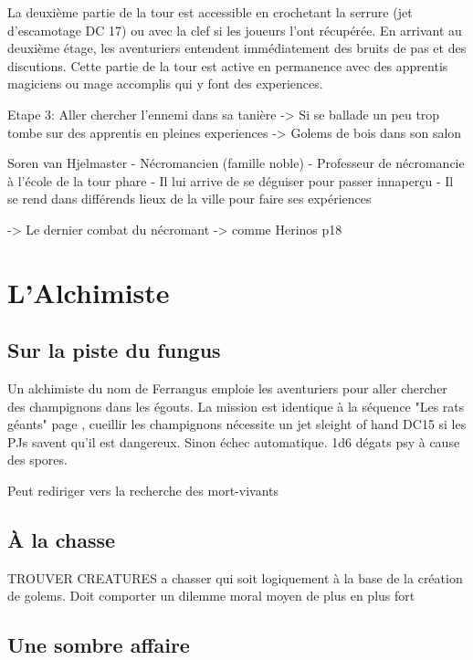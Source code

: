 La deuxième partie de la tour est accessible en crochetant la serrure (jet d'escamotage DC 17) ou avec
la clef si les joueurs l'ont récupérée. En arrivant au deuxième étage, les aventuriers entendent 
immédiatement des bruits de pas et des discutions. Cette partie de la tour est active en permanence avec
des apprentis magiciens ou mage accomplis qui y font des experiences.

Etape 3: Aller chercher l'ennemi dans sa tanière
 -> Si se ballade un peu trop tombe sur des apprentis en pleines experiences
 -> Golems de bois dans son salon

Soren van Hjelmaster
 - Nécromancien (famille noble)
 - Professeur de nécromancie à l'école de la tour phare
 - Il lui arrive de se déguiser pour passer innaperçu
 - Il se rend dans différends lieux de la ville pour faire ses expériences

 -> Le dernier combat du nécromant -> comme Herinos p18

\section{L'Alchimiste}

\subsection{Sur la piste du fungus}

Un alchimiste du nom de Ferrangus emploie les aventuriers pour aller chercher des champignons dans les
égouts. La mission est identique à la séquence "Les rats géants" page \pageref{ss:RatsGeants}, cueillir 
les champignons nécessite un jet sleight of hand DC15
si les PJs savent qu'il est dangereux. Sinon échec automatique. 1d6 dégats psy à cause des spores.

Peut rediriger vers la recherche des mort-vivants 

\subsection{À la chasse}

TROUVER CREATURES a chasser qui soit logiquement à la base de la création de golems. Doit comporter
un dilemme moral moyen de plus en plus fort

\subsection{Une sombre affaire}


